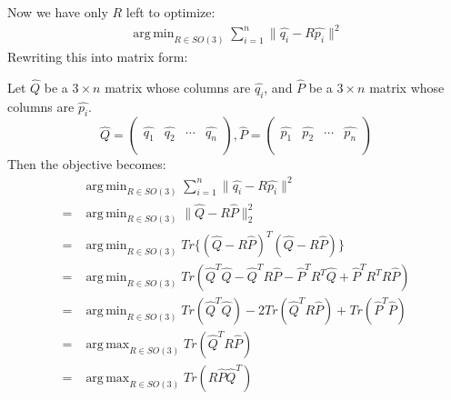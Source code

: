 \documentclass[conference,onecolumn]{IEEEtran}
\DeclareMathOperator*{\argmax}{arg\,max}
\DeclareMathOperator*{\argmin}{arg\,min}
\begin{document}
\begin{enumerate}[label=\arabic{enumi}.]
          Now we have only $R$ left to optimize:
          \begin{align*}
              \argmin_{R \in SO(3)} \sum_{i = 1}^n \|\hat{q_i} - R\hat{p_i}\|^2
          \end{align*}
          Rewriting this into matrix form:

          Let $\hat{Q}$ be a $3 \times n$ matrix whose columns are $\hat{q_i}$, and $\hat{P}$ be a $3 \times n$ matrix whose columns are $\hat{p_i}$.
          $$
              \hat{Q} = \begin{pmatrix}
                            &           &        &           \\
                  \hat{q_1} & \hat{q_2} & \cdots & \hat{q_n} \\
                            &           &        &           \\\end{pmatrix},
              \hat{P} = \begin{pmatrix}
                            &           &        &           \\
                  \hat{p_1} & \hat{p_2} & \cdots & \hat{p_n} \\
                            &           &        &           \\
              \end{pmatrix}
          $$
          Then the objective becomes:
          \begin{align*}
                & \argmin_{R \in SO(3)} \sum_{i = 1}^n \|\hat{q_i} - R\hat{p_i}\|^2                                           \\
              = & \argmin_{R \in SO(3)} \|\hat{Q} - R\hat{P}\|_2^2                                                            \\
              = & \argmin_{R \in SO(3)} Tr\{(\hat{Q} - R\hat{P})^T(\hat{Q} - R\hat{P})\}                                      \\
              = & \argmin_{R \in SO(3)} Tr(\hat{Q}^T\hat{Q} - \hat{Q}^TR\hat{P} - \hat{P}^TR^T\hat{Q} + \hat{P}^TR^TR\hat{P}) \\
              = & \argmin_{R \in SO(3)} Tr(\hat{Q}^T\hat{Q}) - 2 Tr(\hat{Q}^TR\hat{P}) + Tr(\hat{P}^T\hat{P})                 \\
              = & \argmax_{R \in SO(3)} Tr(\hat{Q}^TR\hat{P})                                                                 \\
              = & \argmax_{R \in SO(3)} Tr(R\hat{P}\hat{Q}^T)

\end{align*}
\end{enumerate}
\end{document}
